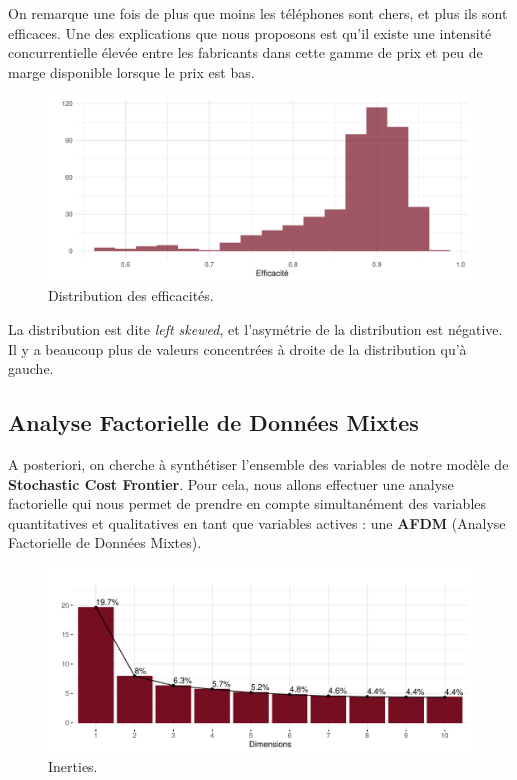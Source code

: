\documentclass[
  12pt,
]{report}
\begin{document}
On remarque une fois de plus que moins les téléphones sont chers, et
plus ils sont efficaces. Une des explications que nous proposons est
qu'il existe une intensité concurrentielle élevée entre les fabricants
dans cette gamme de prix et peu de marge disponible lorsque le prix est
bas.

\begin{figure}[H]

{\centering \includegraphics{report_files/figure-pdf/unnamed-chunk-7-1.pdf}

}

\caption{Distribution des efficacités.}

\end{figure}%

La distribution est dite \emph{left skewed}, et l'asymétrie de la
distribution est négative. Il y a beaucoup plus de valeurs concentrées à
droite de la distribution qu'à gauche.

\newpage

\subsection{Analyse Factorielle de Données
Mixtes}\label{analyse-factorielle-de-donnuxe9es-mixtes}

A posteriori, on cherche à synthétiser l'ensemble des variables de notre
modèle de \textbf{Stochastic Cost Frontier}. Pour cela, nous allons
effectuer une analyse factorielle qui nous permet de prendre en compte
simultanément des variables quantitatives et qualitatives en tant que
variables actives : une \textbf{AFDM} (Analyse Factorielle de Données
Mixtes).

\begin{figure}[H]

{\centering \includegraphics{report_files/figure-pdf/unnamed-chunk-9-1.pdf}

}

\caption{Inerties.}

\end{figure}%
\end{document}
